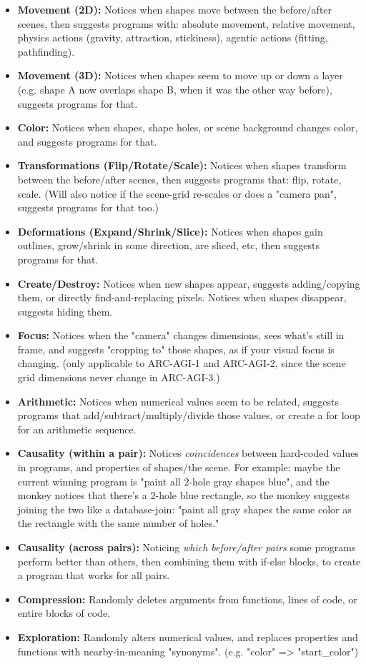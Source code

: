\documentclass{article}
\begin{document}
\begin{itemize}
    \item \textbf{Movement (2D):} Notices when shapes move between the before/after scenes, then suggests programs with: absolute movement, relative movement, physics actions (gravity, attraction, stickiness), agentic actions (fitting, pathfinding).
    \item \textbf{Movement (3D):} Notices when shapes seem to move up or down a layer (e.g. shape A now overlaps shape B, when it was the other way before), suggests programs for that.
    \item \textbf{Color:} Notices when shapes, shape holes, or scene background changes color, and suggests programs for that.
    \item \textbf{Transformations (Flip/Rotate/Scale):} Notices when shapes transform between the before/after scenes, then suggests programs that: flip, rotate, scale. (Will also notice if the scene-grid re-scales or does a "camera pan", suggests programs for that too.)
    \item  \textbf{Deformations (Expand/Shrink/Slice):} Notices when shapes gain outlines, grow/shrink in some direction, are sliced, etc, then suggests programs for that.
    \item \textbf{Create/Destroy:} Notices when new shapes appear, suggests adding/copying them, or directly find-and-replacing pixels. Notices when shapes disappear, suggests hiding them.
    \item \textbf{Focus:} Notices when the "camera" changes dimensions, sees what's still in frame, and suggests "cropping to" those shapes, as if your visual focus is changing. (only applicable to ARC-AGI-1 and ARC-AGI-2, since the scene grid dimensions never change in ARC-AGI-3.)
    \item \textbf{Arithmetic:} Notices when numerical values seem to be related, suggests programs that add/subtract/multiply/divide those values, or create a for loop for an arithmetic sequence.
    \item \textbf{Causality (within a pair):} Notices \textit{coincidences} between hard-coded values in programs, and properties of shapes/the scene. For example: maybe the current winning program is "paint all 2-hole gray shapes blue", and the monkey notices that there's a 2-hole blue rectangle, so the monkey suggests joining the two like a database-join: "paint all gray shapes the same color as the rectangle with the same number of holes."
    \item \textbf{Causality (across pairs):} Noticing \textit{which before/after pairs} some programs perform better than others, then combining them with if-else blocks, to create a program that works for all pairs.
    \item \textbf{Compression:} Randomly deletes arguments from functions, lines of code, or entire blocks of code.
    \item \textbf{Exploration:} Randomly alters numerical values, and replaces properties and functions with nearby-in-meaning "synonyms". (e.g. "color" => "start\_color")
\end{itemize}
\end{document}
